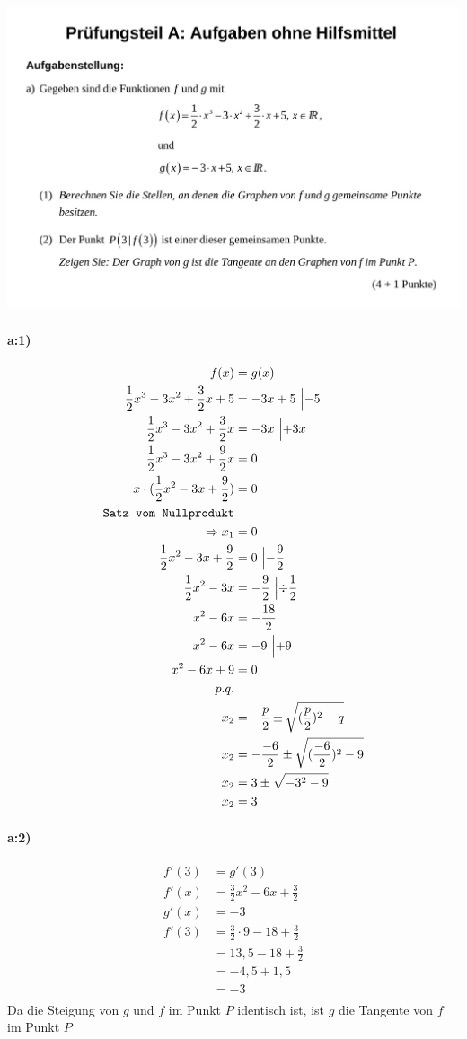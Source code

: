 \documentclass[12pt,a4paper]{report}
\begin{document}
	\newpage
	\includegraphics[width=\textwidth]{Abituraufgabe.JPG}
	\paragraph{a:1)}
	\begin{align*}
		f(x) &= g(x) \\
		\frac{1}{2}x^3 - 3x^2 + \frac{3}{2}x + 5 &= -3x+5\ \Bigl|-5 \\
		\frac{1}{2}x^3 - 3x^2 + \frac{3}{2}x &= -3x\ \Bigl|+3x \\
		\frac{1}{2}x^3 - 3x^2 + \frac{9}{2}x &= 0  \\
		x \cdot (\frac{1}{2}x^2 - 3x + \frac{9}{2}) &= 0 \\
		\texttt{Satz vom Nullprodukt}& \\
		\Rightarrow x_1 &= 0 \\
		\frac{1}{2}x^2 - 3x + \frac{9}{2} &= 0\ \Bigl|-\frac{9}{2} \\
		\frac{1}{2}x^2 - 3x &= -\frac{9}{2}\ \Bigl|\div \frac{1}{2} \\
		x^2 - 6x &= -\frac{18}{2} \\
		x^2 - 6x &= -9\ \Bigl|+9 \\
		x^2 - 6x + 9 &= 0 \\
		p.q.& \\
		x_{2} &= -\frac{p}{2} \pm \sqrt{(\frac{p}{2})^2 - q} \\
		x_{2} &= -\frac{-6}{2} \pm \sqrt{(\frac{-6}{2})^2 - 9} \\
		x_{2} &= 3 \pm \sqrt{-3^2 - 9} \\
		x_{2} &= 3
	\end{align*}
	\paragraph{a:2)}
	\begin{align*}
		f'(3) &= g'(3) \\
		f'(x) &= \frac{3}{2}x^2 - 6x + \frac{3}{2} \\
		g'(x) &= -3 \\
		f'(3) &= \frac{3}{2} \cdot 9 - 18 + \frac{3}{2} \\
		&= 13,5 - 18 + \frac{3}{2} \\
		&= -4,5 + 1,5 \\
		&= -3 \\
	\end{align*}
	Da die Steigung von $g$ und $f$ im Punkt $P$ identisch ist, ist $g$ die Tangente von $f$ im Punkt $P$
\end{document}
